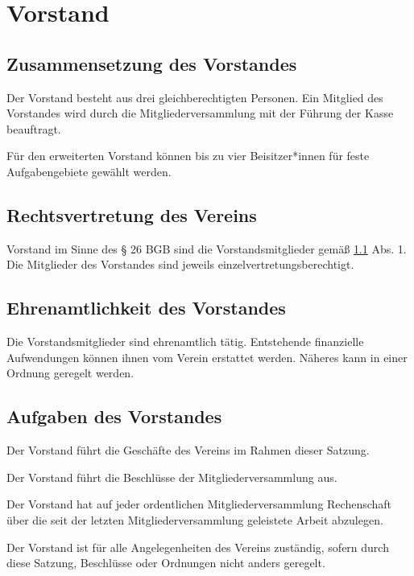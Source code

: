 \chapter{Vorstand}\label{cha:vorstand}

\section{Zusammensetzung des Vorstandes}\label{sec:vorstand}
\begin{absätze}
    \item Der Vorstand besteht aus drei gleichberechtigten Personen. Ein Mitglied des Vorstandes wird durch die Mitgliederversammlung mit der Führung der Kasse beauftragt.
    \item Für den erweiterten Vorstand können bis zu vier Beisitzer*innen für feste Aufgabengebiete gewählt werden.
\end{absätze}

\section{Rechtsvertretung des Vereins}
Vorstand im Sinne des § 26 BGB sind die Vorstandsmitglieder gemäß \ref{sec:vorstand} Abs. 1.
Die Mitglieder des Vorstandes sind jeweils einzelvertretungsberechtigt.

\section{Ehrenamtlichkeit des Vorstandes}
Die Vorstandsmitglieder sind ehrenamtlich tätig. Entstehende finanzielle Aufwendungen können ihnen vom Verein erstattet werden. Näheres kann in einer Ordnung geregelt werden.
    
\section{Aufgaben des Vorstandes}
\begin{absätze}
    \item Der Vorstand führt die Geschäfte des Vereins im Rahmen dieser Satzung.
    \item Der Vorstand führt die Beschlüsse der Mitgliederversammlung aus.
    \item Der Vorstand hat auf jeder ordentlichen Mitgliederversammlung Rechenschaft über die seit der letzten Mitgliederversammlung geleistete Arbeit abzulegen.
    \item Der Vorstand ist für alle Angelegenheiten des Vereins zuständig, sofern durch diese Satzung, Beschlüsse oder Ordnungen nicht anders geregelt.
\end{absätze}

